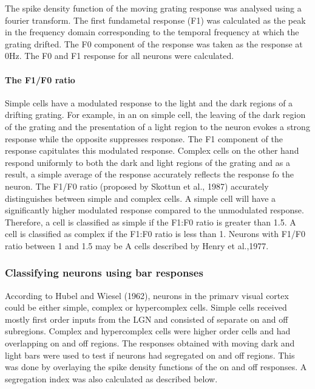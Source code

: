 					
					The spike density function of the moving grating response was analysed using a fourier transform. The first fundametal response (F1) was calculated as the peak in the frequency domain corresponding to the temporal frequency at which the grating drifted. The F0 component of the response was taken as the response at 0Hz. The F0 and F1 response for all neurons were calculated. 
					
					\paragraph{The F1/F0 ratio}
					
					Simple cells have a modulated response to the light and the dark regions of a drifting grating. For example, in an on simple cell, the leaving of the dark region of the grating and the presentation of a light region to the neuron evokes a strong response while the opposite suppresses response. The F1 component of the response capitulates this modulated response. Complex cells on the other hand respond uniformly to both the dark and light regions of the grating and as a result, a simple average of the response accurately reflects the response fo the neuron. The F1/F0 ratio (proposed by Skottun et al., 1987) accurately distinguishes between simple and complex cells. A simple cell will have a significantly higher modulated response compared to the unmodulated response. Therefore, a cell is classified as simple if the F1:F0 ratio is greater than 1.5. A cell is classified as complex if the F1:F0 ratio is less than 1. Neurons with F1/F0 ratio between 1 and 1.5 may be A cells described by Henry et al.,1977.
					 
				\subsubsection{Classifying neurons using bar responses}
					According to Hubel and Wiesel (1962), neurons in the primarv visual cortex could be either simple, complex or hypercomplex cells. Simple cells received mostly first order inputs from the LGN and consisted of separate on and off subregions. Complex and hypercomplex cells were higher order cells and had overlapping on and off regions. The responses obtained with moving dark and light bars were used to test if neurons had segregated on and off regions. This was done by overlaying the spike density functions of the on and off responses. A segregation index was also calculated as described below.
					
